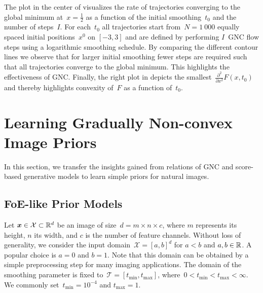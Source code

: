 \documentclass{article}
\newcommand{\X}{\mathcal{X}}
\newcommand{\T}{\mathcal{T}}
\newcommand{\tmin}{t_\mathrm{min}}
\newcommand{\tmax}{t_\mathrm{max}}
\theoremstyle{plain}
\theoremstyle{definition}
\theoremstyle{remark}
\begin{document}
The plot in the center of  visualizes the rate of trajectories converging to the global minimum at~$x=\tfrac12$ as a function of the initial smoothing~$t_0$ and the number of steps~$I$.
For each~$t_0$ all trajectories start from~$N=1\ 000$ equally spaced initial positions~$x^0$ on $[-3,3]$ and are defined by performing $I$~GNC flow steps using a logarithmic smoothing schedule.
By comparing the different contour lines we observe that for larger initial smoothing fewer steps are required such that all trajectories converge to the global minimum.
This highlights the effectiveness of GNC.
Finally, the right plot in  depicts the smallest~$\frac{\partial^2}{\partial x^2}F(x,t_0)$ and thereby highlights convexity of~$F$ as a function of~$t_0$.

\section{Learning Gradually Non-convex Image Priors}
In this section, we transfer the insights gained from relations of GNC and score-based generative models to learn simple priors for natural images.

\subsection{FoE-like Prior Models}
Let $\vx\in\X\subset\R^d$ be an image of size~$d=m\times n\times c$, where $m$ represents its height, $n$ its width, and $c$ is the number of feature channels.
Without loss of generality, we consider the input domain~$\X=[a,b]^d$ for $a<b$ and $a,b\in\mathbb{R}$.
A popular choice is $a=0$ and $b=1$.
Note that this domain can be obtained by a simple preprocessing step for many imaging applications.
The domain of the smoothing parameter is fixed to~$\T=[\tmin,\tmax]$, where~$0<\tmin<\tmax<\infty$.
We commonly set~$\tmin=10^{-4}$ and $\tmax=1$.
\end{document}
